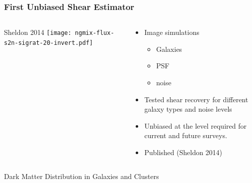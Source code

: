 \documentclass{beamer}
\begin{document}
\frame
{
    \frametitle{First Unbiased Shear Estimator}

    \begin{columns}

        \begin{column}{0.5\textwidth}    
            \begin{center}
                \hfill {\tiny Sheldon 2014}
                \newline
            \texttt{[image: ngmix-flux-s2n-sigrat-20-invert.pdf]}
            \end{center}
        \end{column}

        \begin{column}{0.5\textwidth}    
            \begin{itemize}

                \item Image simulations
                    \begin{itemize}
                        \item Galaxies
                        \item PSF
                        \item noise
                    \end{itemize}

                \item Tested shear recovery for different galaxy types
                    and noise levels

                \item Unbiased at the level required for current and future surveys.

                \item {\color{gold} Published (Sheldon 2014)}

            \end{itemize}
        \end{column}


    \end{columns}
}

\frame
{

    {\Huge Dark Matter Distribution in Galaxies and Clusters}

}
\end{document}
